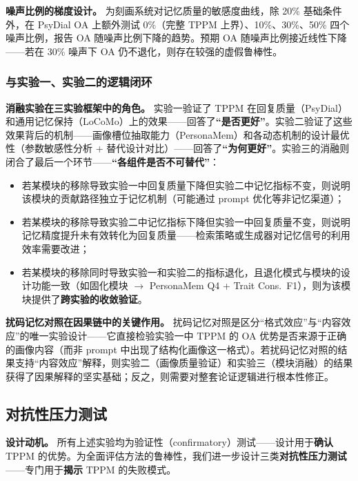\documentclass[12pt,a4paper]{article}
\begin{document}
\textbf{噪声比例的梯度设计。} 为刻画系统对记忆质量的敏感度曲线，除 20\% 基础条件外，在 PsyDial OA 上额外测试 0\%（完整 TPPM 上界）、10\%、30\%、50\% 四个噪声比例，报告 OA 随噪声比例下降的趋势。预期 OA 随噪声比例接近线性下降——若在 30\% 噪声下 OA 仍不退化，则存在较强的虚假鲁棒性。

\subsubsection{与实验一、实验二的逻辑闭环}

\textbf{消融实验在三实验框架中的角色。} 实验一验证了 TPPM 在回复质量（PsyDial）和通用记忆保持（LoCoMo）上的效果——回答了\textbf{``是否更好''}。实验二验证了这些效果背后的机制——画像槽位抽取能力（PersonaMem）和各动态机制的设计最优性（参数敏感性分析 + 替代设计对比）——回答了\textbf{``为何更好''}。实验三的消融则闭合了最后一个环节——\textbf{``各组件是否不可替代''}：

\begin{itemize}
  \item 若某模块的移除导致实验一中回复质量下降但实验二中记忆指标不变，则说明该模块的贡献路径独立于记忆机制（可能通过 prompt 优化等非记忆渠道）；
  \item 若某模块的移除导致实验二中记忆指标下降但实验一中回复质量不变，则说明记忆精度提升未有效转化为回复质量——检索策略或生成器对记忆信号的利用效率需要改进；
  \item 若某模块的移除同时导致实验一和实验二的指标退化，且退化模式与模块的设计功能一致（如固化模块 $\to$ PersonaMem Q4 + Trait Cons.\ F1），则为该模块提供了\textbf{跨实验的收敛验证}。
\end{itemize}

\textbf{扰码记忆对照在因果链中的关键作用。} 扰码记忆对照是区分``格式效应''与``内容效应''的唯一实验设计——它直接检验实验一中 TPPM 的 OA 优势是否来源于正确的画像内容（而非 prompt 中出现了结构化画像这一格式）。若扰码记忆对照的结果支持``内容效应''解释，则实验二（画像质量验证）和实验三（模块消融）的结果获得了因果解释的坚实基础；反之，则需要对整套论证逻辑进行根本性修正。

\subsection{对抗性压力测试}
\label{sec:stress}

\textbf{设计动机。} 所有上述实验均为验证性（confirmatory）测试——设计用于\textbf{确认} TPPM 的优势。为全面评估方法的鲁棒性，我们进一步设计三类\textbf{对抗性压力测试}——专门用于\textbf{揭示} TPPM 的失败模式。
\end{document}
